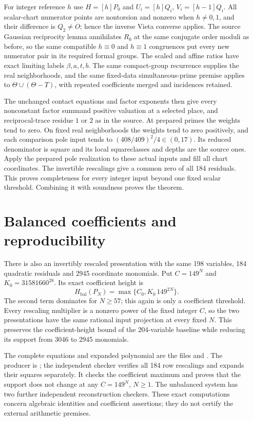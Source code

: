 \documentclass[11pt]{article}
\begin{document}
For integer reference $h$ use $H=[h]P_0$ and
$U_i=[h]Q_i$, $V_i=[h-1]Q_i$. All scalar-chart numerator points
are nontorsion and nonzero when $h\ne0,1$, and their difference is
$Q_2\ne O$; hence the inverse Vieta converse applies.
The source Gaussian reciprocity lemma annihilates $R_0$ at the same
conjugate order moduli as before, so the same compatible $h\equiv0$
and $h\equiv1$ congruences put every new numerator pair in its required
formal groups. The scaled and affine ratios have exact limiting labels
$\beta,a,t,b$. The same compact-group recurrence supplies the real
neighborhoods, and the same fixed-data simultaneous-prime premise
applies to $\Theta\cup(\Theta-T)$, with repeated coefficients merged
and incidences retained.

The unchanged contact equations and factor exponents then give every
nonconstant factor summand positive valuation at a selected place, and
reciprocal-trace residue $1$ or $2$ as in the source. At prepared primes
the weights tend to zero. On fixed real neighborhoods the weights tend
to zero positively, and each comparison pole input tends to
$(408/409)^2/4\in(0,17)$. Its reduced denominator is square and its
local squareclasses and depths are the source ones. Apply the prepared
pole realization to these actual inputs and fill all chart coordinates.
The invertible rescalings give a common zero of all 184 residuals.
This proves completeness for every integer input beyond one fixed scalar
threshold. Combining it with soundness proves the theorem.

\section*{Balanced coefficients and reproducibility}
There is also an invertibly rescaled presentation with the same 198
variables, 184 quadratic residuals and 2945 coordinate monomials.
Put $C=149^N$ and $K_0=31581660^{28}$. Its exact coefficient height is
\[
 H_{\mathrm{bal}}(P_N)=\max\{C_0,K_0\,149^{2N}\}.
\]
The second term dominates for $N\ge57$; this again is only a coefficient
threshold. Every rescaling multiplier is a nonzero power of the fixed
integer $C$, so the two presentations have the same rational input
projection at every fixed $N$. This preserves the coefficient-height
bound of the 204-variable baseline while reducing its support from
3046 to 2945 monomials.

The complete equations and expanded polynomial are the files
 and
.
The producer is ; the
independent checker  verifies all
184 row rescalings and expands their squares separately. It checks the
coefficient maximum and proves that the support does not change at any
$C=149^N$, $N\ge1$. The unbalanced system has two further independent
reconstruction checkers. These exact computations concern algebraic
identities and coefficient assertions; they do not certify the external
arithmetic premises.
\end{document}
